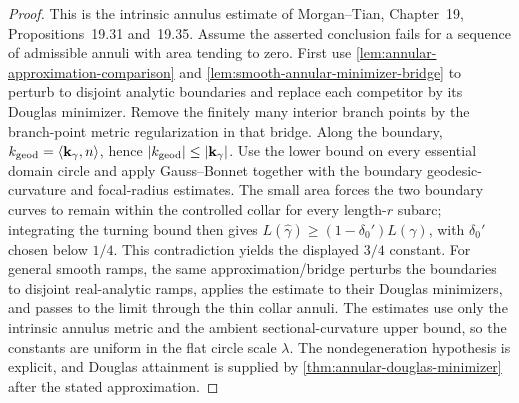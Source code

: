 \begin{proof}
This is the intrinsic annulus estimate of Morgan--Tian, Chapter~19,
Propositions~19.31 and~19.35.  Assume the asserted conclusion fails for a
sequence of admissible annuli with area tending to zero.  First use
\ref{lem:annular-approximation-comparison} and
\ref{lem:smooth-annular-minimizer-bridge} to perturb to disjoint analytic
boundaries and replace each competitor by its Douglas minimizer.  Remove the
finitely many interior branch points by the branch-point metric
regularization in that bridge.  Along the boundary,
$k_{\rm geod}=\langle\mathbf k_\gamma,n\rangle$, hence
$|k_{\rm geod}|\le|\mathbf k_\gamma|$.  Use the lower bound on every
essential domain circle and apply Gauss--Bonnet together with the boundary
geodesic-curvature and focal-radius estimates.  The small area forces the two
boundary curves to remain within the controlled collar for every length-$r$
subarc; integrating the turning bound then gives
$L(\widehat\gamma)\ge(1-\delta_0')L(\gamma)$, with
$\delta_0'$ chosen below $1/4$.  This contradiction yields the displayed
$3/4$ constant.  For general smooth ramps, the same approximation/bridge
perturbs the boundaries to disjoint real-analytic ramps, applies the estimate
to their Douglas minimizers, and passes to the limit through the thin collar
annuli.  The estimates use only
the intrinsic annulus metric and the ambient sectional-curvature upper bound,
so the constants are uniform in the flat circle scale $\lambda$.  The
nondegeneration hypothesis is explicit, and Douglas attainment is supplied
by \ref{thm:annular-douglas-minimizer} after the stated approximation.
\end{proof}


